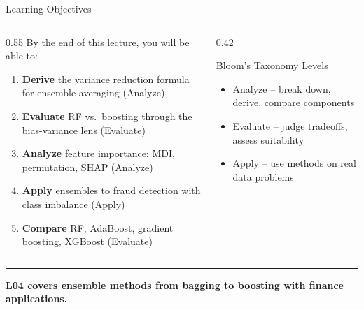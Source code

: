 \documentclass[8pt,aspectratio=169]{beamer}
\newcommand{\bottomnote}[1]{%
\vfill
\vspace{-2mm}
\textcolor{mllavender2}{\rule{\textwidth}{0.4pt}}
\vspace{1mm}
\footnotesize
\textbf{#1}
}
\newenvironment{compactlist}{%
  \begin{itemize}%
    \setlength{\itemsep}{2pt}%
    \setlength{\parskip}{0pt}%
    \setlength{\parsep}{0pt}%
}{%
  \end{itemize}%
}
\begin{document}
\begin{frame}{Learning Objectives}
\begin{columns}[T]
\begin{column}{0.55\textwidth}
\small
By the end of this lecture, you will be able to:
\begin{enumerate}
\setlength{\itemsep}{4pt}
\item \textbf{Derive} the variance reduction formula for ensemble averaging (Analyze)
\item \textbf{Evaluate} RF vs.\ boosting through the bias-variance lens (Evaluate)
\item \textbf{Analyze} feature importance: MDI, permutation, SHAP (Analyze)
\item \textbf{Apply} ensembles to fraud detection with class imbalance (Apply)
\item \textbf{Compare} RF, AdaBoost, gradient boosting, XGBoost (Evaluate)
\end{enumerate}
\end{column}
\begin{column}{0.42\textwidth}
\small
\begin{block}{Bloom's Taxonomy Levels}
\begin{compactlist}
\item \textcolor{mlblue}{Analyze} -- break down, derive, compare components
\item \textcolor{mlgreen}{Evaluate} -- judge tradeoffs, assess suitability
\item \textcolor{mlorange}{Apply} -- use methods on real data problems
\end{compactlist}
\end{block}
\end{column}
\end{columns}
\bottomnote{L04 covers ensemble methods from bagging to boosting with finance applications.}
\end{frame}

\end{document}
